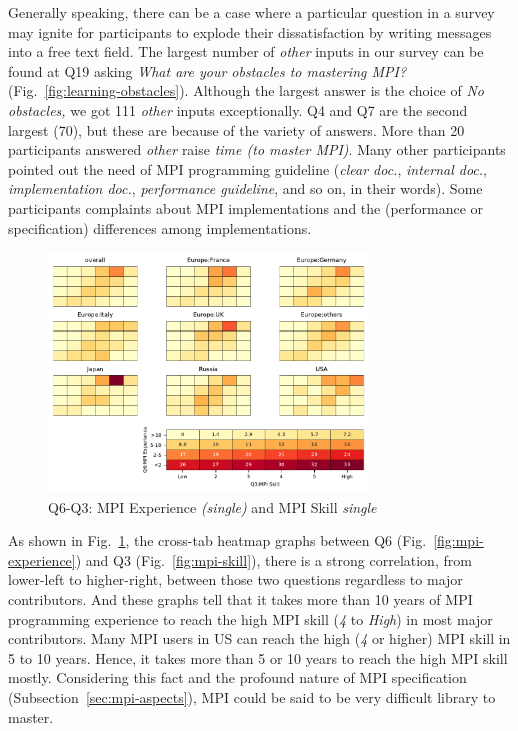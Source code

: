 \documentclass[preprint,5p,times]{elsarticle}
\def\myquote#1{{\it #1}}
\def\mcountries{major contributors}%
\begin{document}
Generally speaking, there can be a case where a particular question in
a survey may ignite for participants to explode their dissatisfaction
by writing messages into a free text field.
The largest number of \myquote{other} inputs in our survey can be found
at Q19 asking \myquote{What are your obstacles to mastering MPI?}
(Fig.~\ref{fig:learning-obstacles}). Although the largest answer is
the choice of \myquote{No obstacles,} we got 111 \myquote{other} inputs
exceptionally. Q4 and Q7 are the second largest (70), but these are
because of the variety of answers.
More than 20 participants answered \myquote{other} raise
\myquote{time (to master MPI)}. Many other participants pointed
out the need of MPI programming guideline (\myquote{clear doc.},
\myquote{internal doc.}, \myquote{implementation
  doc.}, \myquote{performance guideline}, and so on, in their words).
Some participants complaints about MPI implementations and the
(performance or specification) differences among implementations.

\begin{figure}[htb]
\begin{center}
\includegraphics[width=8.5cm]{Figs/Q6-Q3.pdf}
\caption{Q6-Q3: MPI Experience {\it(single)} and MPI Skill {\it single}}
\label{fig:experience-and-skill}
\end{center}
\end{figure}

As shown in Fig.~\ref{fig:experience-and-skill}, the cross-tab heatmap
graphs between Q6 (Fig.~\ref{fig:mpi-experience}) and Q3
(Fig.~\ref{fig:mpi-skill}), there is a strong correlation, from
lower-left to higher-right, between those
two questions regardless to \mcountries. And these graphs
tell that it takes more than 10 years of MPI programming experience to
reach the high MPI skill (\myquote{4} to \myquote{High}) in most
\mcountries. Many MPI users in US can reach the high
(\myquote{4} or higher) MPI skill in 5 to 10 years. Hence, it takes
more than 5 or 10 years to reach the high MPI skill
mostly. Considering this fact
and the profound nature of MPI specification
(Subsection~\ref{sec:mpi-aspects}), MPI could be said to be very
difficult library to master.
\end{document}

